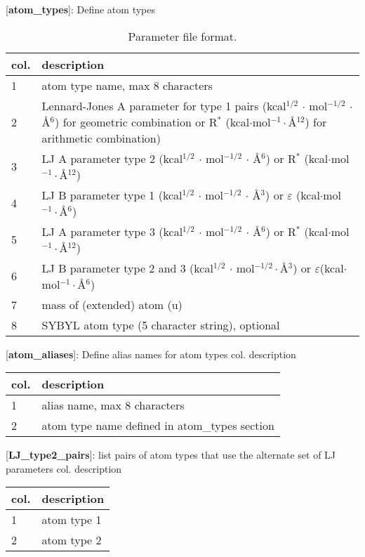 \documentclass[a4paper,11pt]{article}
\begin{document}
\small
\begin{table}[h]
\caption{Parameter file format.} \label{tab:prm_f_f}
[\textbf{atom\_types}]: Define atom types \\
\begin{tabularx}{\textwidth}{|l|X|}
\hline \bf{col.} & \bf{description} \\
\hline 1 & atom type name, max 8 characters \\
	\hline 2 &  Lennard-Jones A parameter for type 1 pairs (kcal$^{1/2}$ $\cdot$ mol$^{-1/2}$ $\cdot$ {\AA}$^{6}$)
	for geometric combination or R$^*$ (kcal$\cdot$mol$^{-1}\cdot${\AA}$^{12}$) for arithmetic combination) \\
	\hline 3 & LJ A parameter type 2 (kcal$^{1/2}$ $\cdot$ mol$^{-1/2}$ $\cdot$ {\AA}$^{6}$) or R$^*$ (kcal$\cdot$mol$^{-1}\cdot${\AA}$^{12}$)\\
	\hline 4 &  LJ B parameter type 1 (kcal$^{1/2}$ $\cdot$ mol$^{-1/2}$ $\cdot$ {\AA}$^{3}$) or $\varepsilon$ (kcal$\cdot$mol$^{-1}\cdot${\AA}$^{6}$)\\
	\hline 5 & LJ A parameter type 3 (kcal$^{1/2}$ $\cdot$ mol$^{-1/2}$ $\cdot$ {\AA}$^{6}$) or R$^*$ (kcal$\cdot$mol$^{-1}\cdot${\AA}$^{12}$)\\
	\hline 6  & LJ B parameter type 2 and 3 (kcal$^{1/2}$ $\cdot$ mol$^{-1/2}\cdot${\AA}$^{3}$) or $\varepsilon$(kcal$\cdot$mol$^{-1}\cdot${\AA}$^{6}$)\\
\hline 7 & mass of (extended) atom (u) \\
\hline 8  & SYBYL atom type (5 character string), optional\\
\hline
\end{tabularx}
\end{table}

[\textbf{atom\_aliases}]: Define alias names for atom types col. description \\
\begin{tabularx}{\textwidth}{|l|X|}
\hline \bf{col.} & \bf{description} \\
\hline 1  & alias name, max 8 characters \\
\hline 2 & atom type name defined in atom\_types section \\
\hline
\end{tabularx}

[\textbf{LJ\_type2\_pairs}]: list pairs of atom types that use the
alternate set of LJ parameters col. description \\
\begin{tabularx}{\textwidth}{|l|X|}
\hline \bf{col.} & \bf{description} \\
\hline 1  & atom type 1 \\
\hline 2 &atom type 2 \\
\hline
\end{tabularx}
\end{document}
